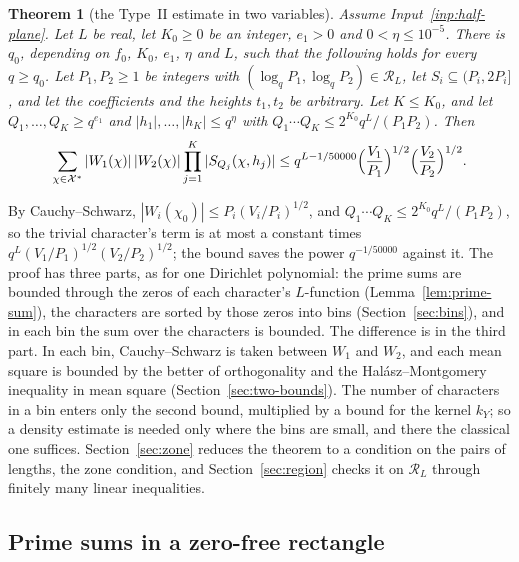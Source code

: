 \documentclass[11pt]{article}
\newtheorem{theorem}{Theorem}[section]
\theoremstyle{definition}
\begin{document}
\begin{theorem}[the Type~II estimate in two variables]\label{thm:type2}
Assume Input~\ref{inp:half-plane}. Let $L$ be real, let $K_0 \ge 0$ be an integer, $e_1 > 0$ and $0 < \eta \le
10^{-5}$. There is $q_0$, depending on $f_0$, $K_0$, $e_1$, $\eta$ and $L$, such that the following holds for every
$q \ge q_0$. Let $P_1, P_2 \ge 1$ be integers with $(\log_q P_1, \log_q P_2) \in \mathcal R_L$, let $S_i \subseteq
(P_i, 2P_i]$, and let the coefficients and the heights $t_1, t_2$ be arbitrary. Let $K \le K_0$, and let $Q_1, \dots,
Q_K \ge q^{e_1}$ and $|h_1|, \dots, |h_K| \le q^\eta$ with $Q_1 \cdots Q_K \le 2^{K_0} q^L/(P_1 P_2)$. Then
\[
  \sum_{\chi \in \mathcal X^*} |W_1(\chi)|\, |W_2(\chi)| \prod_{j=1}^K |S_{Q_j}(\chi, h_j)|
  \le q^{L - 1/50000} \Bigl(\frac{V_1}{P_1}\Bigr)^{1/2} \Bigl(\frac{V_2}{P_2}\Bigr)^{1/2}.
\]
\end{theorem}

By Cauchy--Schwarz, $|W_i(\chi_0)| \le P_i (V_i/P_i)^{1/2}$, and $Q_1 \cdots Q_K \le 2^{K_0} q^L/(P_1P_2)$, so the
trivial character's term is at most a constant times $q^L (V_1/P_1)^{1/2}(V_2/P_2)^{1/2}$; the bound saves the power
$q^{-1/50000}$ against it. The proof has three parts, as for one Dirichlet polynomial: the
prime sums are bounded through the zeros of each character's $L$-function (Lemma~\ref{lem:prime-sum}), the
characters are sorted by those zeros into bins (Section~\ref{sec:bins}), and in each bin the sum over the characters
is bounded. The difference is in the third part. In each bin, Cauchy--Schwarz is taken between $W_1$ and $W_2$, and
each mean square is bounded by the better of orthogonality and the Hal\'asz--Montgomery inequality in mean square
(Section~\ref{sec:two-bounds}). The number of characters in a bin enters only the second bound, multiplied by a
bound for the kernel $k_Y$; so a density estimate is needed only where the bins are small, and there the classical
one suffices. Section~\ref{sec:zone}
reduces the theorem to a condition on the pairs of lengths, the zone condition, and Section~\ref{sec:region} checks
it on $\mathcal R_L$ through finitely many linear inequalities.

\subsection{Prime sums in a zero-free rectangle}
\end{document}

